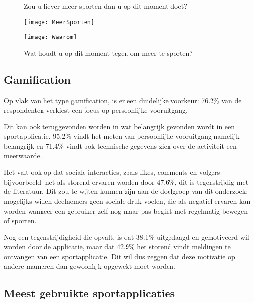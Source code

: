 \begin{figure}[htbp]
    \begin{minipage}[t]{0.48\linewidth} %
        \centering
        \caption[Zou u liever meer sporten dan u op dit moment doet?]{Zou u liever meer sporten dan u op dit moment doet?}
        \texttt{[image: MeerSporten]}
        \label{fig:meerBewegen}
    \end{minipage}
    \hfill
    \begin{minipage}[t]{0.48\linewidth} %
        \centering
        \caption[Wat houdt u op dit moment tegen om meer te sporten?]{Wat houdt u op dit moment tegen om meer te sporten?}
        \texttt{[image: Waarom]}
        \label{fig:waarom}
    \end{minipage}
\end{figure}

\subsection{Gamification}

Op vlak van het type gamification, is er een duidelijke voorkeur: 76.2\% van de respondenten verkiest een focus op persoonlijke vooruitgang.

Dit kan ook teruggevonden worden in wat belangrijk gevonden wordt in een sportapplicatie. 95.2\% vindt het meten van persoonlijke vooruitgang namelijk belangrijk en 71.4\% vindt ook technische gegevens zien over de activiteit een meerwaarde.

Het valt ook op dat sociale interacties, zoals likes, comments en volgers bijvoorbeeld, net als storend ervaren worden door 47.6\%, dit is tegenstrijdig met de literatuur. Dit zou te wijten kunnen zijn aan de doelgroep van dit onderzoek: mogelijks willen deelnemers geen sociale druk voelen, die als negatief ervaren kan worden wanneer een gebruiker zelf nog maar pas begint met regelmatig bewegen of sporten.

Nog een tegenstrijdigheid die opvalt, is dat 38.1\% uitgedaagd en gemotiveerd wil worden door de applicatie, maar dat 42.9\% het storend vindt meldingen te ontvangen van een sportapplicatie. Dit wil dus zeggen dat deze motivatie op andere manieren dan gewoonlijk opgewekt moet worden.

\subsection{Meest gebruikte sportapplicaties}

